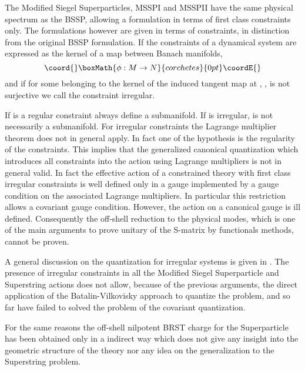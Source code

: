 \documentclass[a4paper,10pt]{article}
\begin{document}
The Modified Siegel Superparticles, MSSPI \cite{[6]} and MSSPII \cite{[7]} have
the same physical spectrum as the BSSP, allowing a formulation in
terms of first class constraints only. The formulations however
are given in terms of {} constraints, in
distinction from the original BSSP formulation. If the constraints
of a dynamical system are expressed as the kernel of a map  \myHighlight{$\phi$}\coordHE{}
between Banach manifolds,
\begin{displaymath}\coord{}\boxMath{
\phi :M\to N
}{corchetes}{0pt}\coordE{}\end{displaymath}
and if for some \coordHE{} belonging to the kernel of \myHighlight{$\phi$}\coordHE{} the induced tangent map
at  \coordHE{}, \coordHE{}, is not surjective we call the constraint irregular.

If \myHighlight{$\phi$}\coordHE{} is a regular constraint \coordHE{} always define a
submanifold. If \myHighlight{$\phi$}\coordHE{} is irregular, \coordHE{} is not necessarily a
submanifold. For irregular constraints the Lagrange multiplier theorem does
not in general apply. In fact one of the hypothesis is the regularity of the
constraints. This implies that the generalized canonical quantization which
introduces all constraints into the action using Lagrange multipliers is not
in general valid. In fact the effective action of a constrained theory with
first class irregular constraints is well defined only in a gauge implemented
by a gauge condition on the associated Lagrange multipliers. In particular
this restriction allows a covariant gauge condition. However, the action on a
canonical gauge is ill defined. Consequently the off-shell reduction to the
physical modes, which is one of the main arguments to prove unitary of the
S-matrix by  functionals methods, cannot be proven.

A general discussion on the quantization for irregular systems is given in \cite{[8]}.
The presence of irregular constraints in all the Modified Siegel Superparticle
and Superstring actions does not allow, because of the previous arguments, the
direct application of the Batalin-Vilkovisky approach to quantize the problem,
and so far have failed to solved the problem of the covariant quantization.

For the same reasons the off-shell nilpotent BRST charge for the
Superparticle \cite{[9]} has been obtained only in a indirect way which does not give
any insight into the geometric structure of the theory nor any idea on the
generalization to the Superstring problem.
\end{document}
